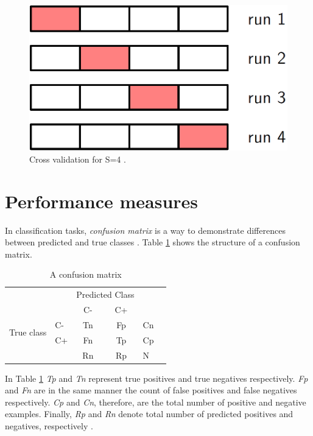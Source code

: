 \begin{figure}
    \includegraphics[width=0.5\linewidth ]{figures/crossv.png}
    \centering
    \caption{Cross validation for S=4 \cite{bishop2006pattern}.}
    \label{fig:crossv}
\end{figure}


\section{Performance measures}
In classification tasks, \textit{confusion matrix} is a way to demonstrate differences between predicted and true classes \cite{Bradley1997}. Table \ref{tab:conf-mat} shows the structure of a confusion matrix.
\begin{table}[]
    \centering
    \begin{tabular}{llccll}
                                &    & \multicolumn{2}{l}{Predicted Class} &    &  \\ \cline{3-4}
                                &    & C-               & C+               &    &  \\ \hline
    \multirow{2}{*}{True class} & C- & Tn               & Fp               & Cn &  \\
                                & C+ & Fn               & Tp               & Cp &  \\
                                &    & Rn               & Rp               & N  &  \\ \hline
    \end{tabular}
    \caption{A confusion matrix}
    \label{tab:conf-mat}
\end{table}

In Table \ref{tab:conf-mat} \textit{Tp} and \textit{Tn} represent true positives and true negatives respectively. \textit{Fp} and \textit{Fn} are in the same manner the count of false positives and false negatives respectively. \textit{Cp} and \textit{Cn}, therefore, are the total number of positive and negative examples. Finally, \textit{Rp} and \textit{Rn} denote total number of predicted positives and negatives, respectively \cite{Bradley1997}.

